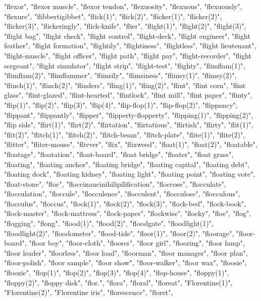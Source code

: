 "flexor",
"flexor muscle",
"flexor tendon",
"flexuosity",
"flexuous",
"flexuously",
"flexure",
"flibbertigibbet",
"flick(1)",
"flick(2)",
"flicker(1)",
"flicker(2)",
"flicker(3)",
"flickeringly",
"flick-knife",
"flier",
"flight(1)",
"flight(2)",
"flight(3)",
"flight bag",
"flight check",
"flight control",
"flight-deck",
"flight engineer",
"flight feather",
"flight formation",
"flightily",
"flightiness",
"flightless",
"flight lieutenant",
"flight-muscle",
"flight officer",
"flight path",
"flight pay",
"flight-recorder",
"flight sergeant",
"flight simulator",
"flight strip",
"flight-test",
"flighty",
"flimflam(1)",
"flimflam(2)",
"flimflammer",
"flimsily",
"flimsiness",
"flimsy(1)",
"flimsy(2)",
"flinch(1)",
"flinch(2)",
"flinders",
"fling(1)",
"fling(2)",
"flint",
"flint corn",
"flint glass",
"flint-glazed",
"flint-hearted",
"flintlock",
"flint mill",
"flint paper",
"flinty",
"flip(1)",
"flip(2)",
"flip(3)",
"flip(4)",
"flip-flop(1)",
"flip-flop(2)",
"flippancy",
"flippant",
"flippantly",
"flipper",
"flipperty-flopperty",
"flipping(1)",
"flipping(2)",
"flip side",
"flirt(1)",
"flirt(2)",
"flirtation",
"flirtatious",
"flirtish",
"flirty",
"flit(1)",
"flit(2)",
"flitch(1)",
"flitch(2)",
"flitch-beam",
"flitch-plate",
"flite(1)",
"flite(2)",
"flitter",
"fliter-mouse",
"flivver",
"flix",
"flixweed",
"float(1)",
"float(2)",
"floatable",
"floatage",
"floatation",
"float-board",
"float bridge",
"floater",
"float grass",
"floating",
"floating anchor",
"floating bridge",
"floating capital",
"floating debt",
"floating dock",
"floating kidney",
"floating light",
"floating point",
"floating vote",
"float-stone",
"floc",
"floccinaucinihilipilification",
"floccose",
"flocculate",
"flocculation",
"floccule",
"flocculence",
"flocculent",
"flocculose",
"flocculous",
"flocculus",
"floccus",
"flock(1)",
"flock(2)",
"flock(3)",
"flock-bed",
"flock-book",
"flock-master",
"flock-mattress",
"flock-paper",
"flockwise",
"flocky",
"floe",
"flog",
"flogging",
"flong",
"flood(1)",
"flood(2)",
"floodgate",
"floodlight(1)",
"floodlight(2)",
"floodometer",
"flood-tide",
"floor(1)",
"floor(2)",
"floorage",
"floor-board",
"floor boy",
"floor-cloth",
"floorer",
"floor girl",
"flooring",
"floor lamp",
"floor leader",
"floorless",
"floor load",
"floorman",
"floor manager",
"floor plan",
"floor-polish",
"floor sample",
"floor show",
"floor-walker",
"floor wax",
"floosie",
"floozie",
"flop(1)",
"flop(2)",
"flop(3)",
"flop(4)",
"flop-house",
"floppy(1)",
"floppy(2)",
"floppy disk",
"flor.",
"flora",
"floral",
"floreat",
"Florentine(1)",
"Florentine(2)",
"Florentine iris",
"florescence",
"floret",
